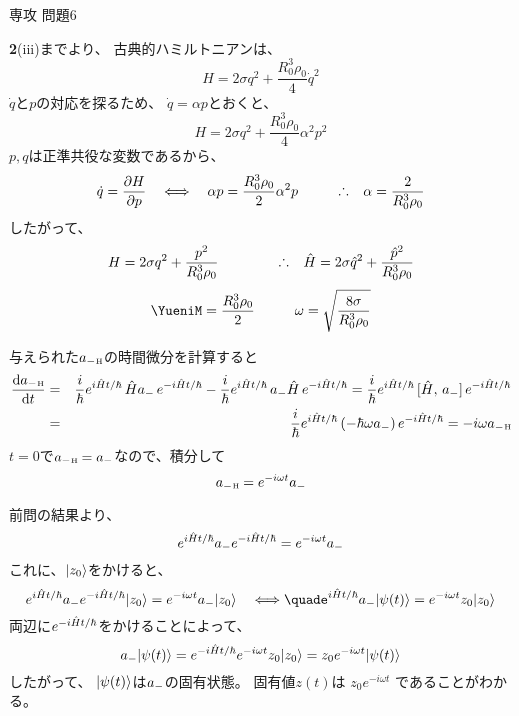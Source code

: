 \documentclass[fleqn]{jbook}
\begin{document}
\begin{answer}{専攻 問題6}{}
\begin{subanswers}
\SubAnswer
  \begin{subsubanswers}
  \SubSubAnswer
    {\bf 2}(iii)までより、 古典的ハミルトニアンは、 
%
    \[H=2\sigma q^2+\frac{R_0^3\rho_0}{4}\dot{q}^2\]
%
    $\dot{q}$と$p$の対応を探るため、 $\dot{q}=\alpha p$とおくと、 
%
    \[H=2\sigma q^2+\frac{R_0^3\rho_0}{4}\alpha^2p^2\]
%
    $p,q$は正準共役な変数であるから、
%
    \[ \dot{q}  = \Partial{H}{p} \quad\Longleftrightarrow\quad%
       \alpha p = \frac{R_0^3\rho_0}{2}\alpha^2p \hspace{10mm}%
       \Yueni \alpha=\frac{2}{R_0^3\rho_0} \]
%
    したがって、 
%
    \[ H=2\sigma q^2+\frac{p^2}{R_0^3\rho_0} \hspace{15mm}%
       \Yueni%
       \hH=2\sigma\hq^2+\frac{\hp^2}{R_0^3\rho_0} \]
%
    \[ \Yueni%
       M = \frac{R_0^3\rho_0}{2} \hspace{10mm}%
       \omega = \sqrt{\frac{8\sigma}{R_0^3\rho_0}} \]

  \SubSubAnswer
    与えられた$\haH$の時間微分を計算すると
%
    \begin{eqnarray*}
      \Deriver{\haH}{t}%
       &=& \frac{i}{\hbar} e^{i\hH t/\hbar} \,\hH \ha \,e^{-i\hH t/\hbar}
         - \frac{i}{\hbar} e^{i\hH t/\hbar} \,\ha \hH \,e^{-i\hH t/\hbar}
        =  \frac{i}{\hbar} e^{i\hH t/\hbar} \,[\hH,\,\ha] \, e^{-i\hH t/\hbar} \\
       &=& \frac{i}{\hbar} e^{i\hH t/\hbar} \,(-\hbar\omega \ha)\, e^{-i\hH t/\hbar}
        = -i\omega \haH
    \end{eqnarray*}
%
    $t=0$で$\haH=\ha$なので、積分して
%
    \[\haH=e^{-i\omega t}\ha\]


  \SubSubAnswer
    前問の結果より、
%
    \[ e^{i\hH t/\hbar}\ha e^{-i\hH t/\hbar} = e^{-i\omega t}\ha \]
%
    これに、$\Ket{z_0}$をかけると、 
%
    \[ e^{i\hH t/\hbar}\ha e^{-i\hH t/\hbar}\Ket{z_0}      = e^{-i\omega t}\ha \Ket{z_0}%
       \quad\Longleftrightarrow\quad%
       e^{i\hH t/\hbar}\ha \Ket{\psi(t)} = e^{-i\omega t}z_0\Ket{z_0} \]
%
    両辺に$e^{-i\hH t/\hbar}$をかけることによって、 
%
    \[ \ha\Ket{\psi(t)}%
       =  e^{-i\hH t/\hbar}e^{-i\omega t}z_0\Ket{z_0}
       =  z_0 e^{-i\omega t}\Ket{\psi(t)} \]
%
    したがって、 $\Ket{\psi(t)}$は$\ha$の固有状態。 固有値$z(t)$は
    $z_0e^{-i\omega t}$ であることがわかる。



\end{subsubanswers}
\end{subanswers}
\end{answer}
\end{document}
